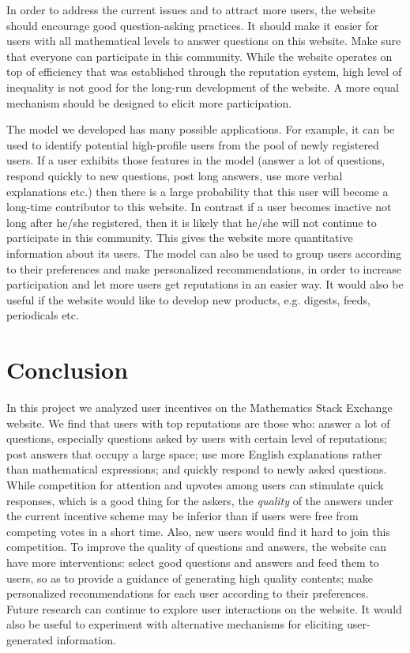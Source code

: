 \documentclass[12pt]{article}
\begin{document}
In order to address the current issues and to attract more users, the website should encourage good question-asking practices. It should make it easier for users with all mathematical levels to answer questions on this website. Make sure that everyone can participate in this community. While the website operates on top of efficiency that was established through the reputation system, high level of inequality is not good for the long-run development of the website. A more equal mechanism should be designed to elicit more participation.


The model we developed has many possible applications. For example, it can be used to identify potential high-profile users from the pool of newly registered users. If a user exhibits those features in the model (answer a lot of questions, respond quickly to new questions, post long answers, use more verbal explanations etc.) then there is a large probability that this user will become a long-time contributor to this website. In contrast if a user becomes inactive not long after he/she registered, then it is likely that he/she will not continue to participate in this community. This gives the website more quantitative information about its users. The model can also be used to group users according to their preferences and make personalized recommendations, in order to increase participation and let more users get reputations in an easier way. It would also be useful if the website would like to develop new products, e.g. digests, feeds, periodicals etc. 

\section{Conclusion}\label{sec:conclusion}
In this project we analyzed user incentives on the Mathematics Stack Exchange website. We find that users with top reputations are those who: answer a lot of questions, especially questions asked by users with certain level of reputations; post answers that occupy a large space; use more English explanations rather than mathematical expressions; and quickly respond to newly asked questions. While competition for attention and upvotes among users can stimulate quick responses, which is a good thing for the askers, the \emph{quality} of the answers under the current incentive scheme may be inferior than if users were free from competing votes in a short time. Also, new users would find it hard to join this competition. To improve the quality of questions and answers, the website can have more interventions: select good questions and answers and feed them to users, so as to provide a guidance of generating high quality contents; make personalized recommendations for each user according to their preferences. Future research can continue to explore user interactions on the website. It would also be useful to experiment with alternative mechanisms for eliciting user-generated information.
\end{document}
